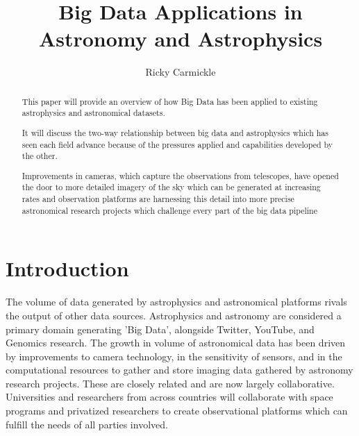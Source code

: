 \documentclass[sigconf]{acmart}
\begin{document}
\title{Big Data Applications in Astronomy and Astrophysics}


\author{Ricky Carmickle}


\begin{abstract}

This paper will provide an overview of how Big Data has been applied to existing astrophysics and astronomical datasets. 

It will discuss the two-way relationship between big data and astrophysics which has seen each field advance because of the pressures applied and capabilities developed by the other.  

Improvements in  cameras, which capture the observations from telescopes, have opened the door to more detailed imagery of the sky which can be generated at increasing rates and observation platforms are harnessing this detail into more precise astronomical research projects which challenge every part of the big data pipeline

\end{abstract}


\maketitle

\section{Introduction}
The volume of data generated by astrophysics and astronomical platforms rivals the output of other data sources. Astrophysics and astronomy are considered a primary domain generating 'Big Data', alongside Twitter, YouTube, and Genomics research\cite{Stephens2015}. The growth in volume of astronomical data has been driven by improvements to camera technology, in the sensitivity of sensors, and in the computational resources to gather and store imaging data gathered by astronomy research projects. These are closely related and are now largely collaborative. Universities and researchers from across countries will collaborate with space programs and privatized researchers to create observational platforms which can fulfill the needs of all parties involved. \\
\end{document}

